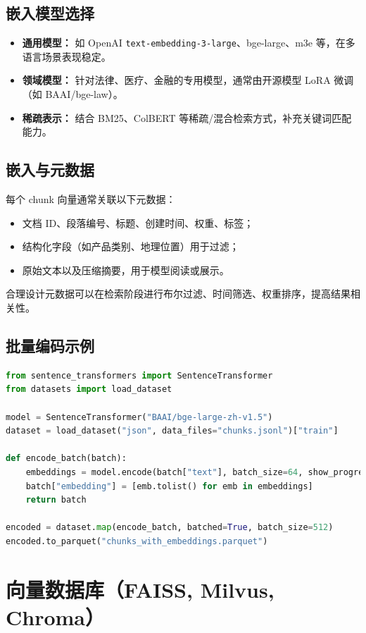 \documentclass[UTF8,zihao=-4]{ctexart}
\begin{document}
\subsection{嵌入模型选择}
\begin{itemize}
  \item \textbf{通用模型：} 如 OpenAI \texttt{text-embedding-3-large}、bge-large、m3e 等，在多语言场景表现稳定。
  \item \textbf{领域模型：} 针对法律、医疗、金融的专用模型，通常由开源模型 LoRA 微调（如 BAAI/bge-law）。
  \item \textbf{稀疏表示：} 结合 BM25、ColBERT 等稀疏/混合检索方式，补充关键词匹配能力。
\end{itemize}

\subsection{嵌入与元数据}
每个 chunk 向量通常关联以下元数据：
\begin{itemize}
  \item 文档 ID、段落编号、标题、创建时间、权重、标签；
  \item 结构化字段（如产品类别、地理位置）用于过滤；
  \item 原始文本以及压缩摘要，用于模型阅读或展示。
\end{itemize}
合理设计元数据可以在检索阶段进行布尔过滤、时间筛选、权重排序，提高结果相关性。

\subsection{批量编码示例}
\begin{lstlisting}[language=Python,caption={使用 SentenceTransformers 批量编码文档 chunk}]
from sentence_transformers import SentenceTransformer
from datasets import load_dataset

model = SentenceTransformer("BAAI/bge-large-zh-v1.5")
dataset = load_dataset("json", data_files="chunks.jsonl")["train"]

def encode_batch(batch):
    embeddings = model.encode(batch["text"], batch_size=64, show_progress_bar=False, normalize_embeddings=True)
    batch["embedding"] = [emb.tolist() for emb in embeddings]
    return batch

encoded = dataset.map(encode_batch, batched=True, batch_size=512)
encoded.to_parquet("chunks_with_embeddings.parquet")
\end{lstlisting}

\section{向量数据库（FAISS, Milvus, Chroma）}
\end{document}
